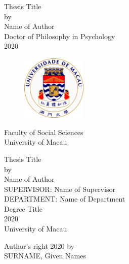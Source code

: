 \documentclass[a4paper, 12pt, twoside]{article}
\begin{document}
\begin{titlepage}
	\begin{center}
	\doublespacing
	Thesis Title\\ %
	[1.5cm]
	by\\
	[1.5cm]
	Name of Author\\
	[2.4cm]
	Doctor of Philosophy in Psychology\\
	[4.5cm]
	2020\\
	[1cm]
		\begin{figure}[h]
			\centering
			\includegraphics[width = 31mm]{fig/umac_logo}
		\end{figure}
	Faculty of Social Sciences\\
	University of Macau
	\end{center}
\end{titlepage}
\begin{titlepage}
	\begin{center}
	\doublespacing
	Thesis Title \\%
	[1.8cm]
	by\\
	[1.8cm]
	Name of Author\\
	[1.8cm]
	SUPERVISOR: Name of Supervisor\\
	[1.8cm]
	DEPARTMENT: Name of Department\\
	[1.8cm]
	Degree Title\\
	[1.8cm]
	2020\\
	[1.8cm]
	University of Macau
	\end{center}
\end{titlepage}
\begin{titlepage}
\begin{center}
Author's right 2020 by\\
SURNAME, Given Names
\end{center}
\end{titlepage}
\newpage\null\thispagestyle{empty}\newpage
\end{document}
